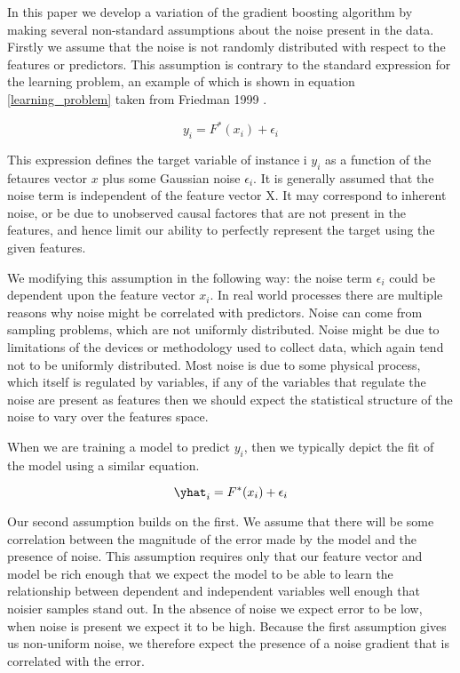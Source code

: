 In this paper we develop a variation of the gradient boosting algorithm by making
several non-standard assumptions about the noise present in the data. 
Firstly we assume that the noise is not randomly distributed with respect to the 
features or predictors. This assumption is contrary to the standard expression for the learning problem, 
an example of which is shown in equation \ref{learning_problem} taken from Friedman 1999 \cite{friedman_1999}.

\begin{equation}
y_i = F^*(x_i) + \epsilon_i
\end{equation}

This expression defines the target variable of instance i $y_i$ as a function of the fetaures vector $x$
plus some Gaussian noise $\epsilon_i$. It is generally assumed that the noise term is independent of the 
feature vector X. It may correspond to inherent noise, or be due to unobserved causal factores that are
not present in the features, and hence limit our ability to perfectly represent the target using the given
features.
 
We modifying this assumption in the following way: the noise term $\epsilon_i$ could be dependent upon the
feature vector $x_i$. In real world processes there are multiple reasons
why noise might be correlated with predictors. Noise can come from sampling problems,
which are not uniformly distributed. Noise might be due to limitations of the devices
or methodology used to collect data, which again tend not to be uniformly distributed.
Most noise is due to some physical process, which itself is regulated by variables,
if any of the variables that regulate the noise are present as features then we should 
expect the statistical structure of the noise to vary over the features space.

When we are training a model to predict $y_i$, then we typically depict the fit of the model
using a similar equation.


\begin{equation}
\yhat_i = F^*(x_i) + \epsilon_i
\end{equation}

Our second assumption builds on the first. We 
assume that there will be some correlation between the magnitude of the error made
by the model and the presence of noise. This assumption requires only that our feature
vector and model be rich enough that we expect the model to be able to learn the 
relationship between dependent and independent variables well enough that noisier samples stand out. 
In the absence of noise we expect error to be low, when noise is present we expect it to be high.
Because the first assumption gives us non-uniform noise, we therefore expect the presence
of a noise gradient that is correlated with the error.

